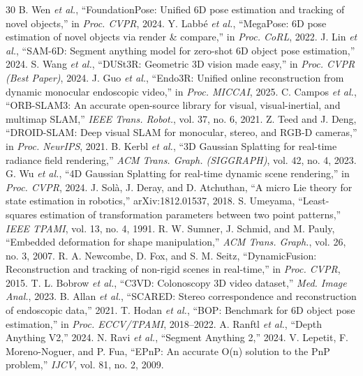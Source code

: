 \documentclass[journal]{IEEEtran}
\begin{document}
\begin{thebibliography}{30}
 B. Wen \emph{et al.}, ``FoundationPose: Unified 6D pose estimation and tracking of novel objects,'' in \emph{Proc. CVPR}, 2024.
 Y. Labb\'e \emph{et al.}, ``MegaPose: 6D pose estimation of novel objects via render \& compare,'' in \emph{Proc. CoRL}, 2022.
 J. Lin \emph{et al.}, ``SAM-6D: Segment anything model for zero-shot 6D object pose estimation,'' 2024.
 S. Wang \emph{et al.}, ``DUSt3R: Geometric 3D vision made easy,'' in \emph{Proc. CVPR (Best Paper)}, 2024.
 J. Guo \emph{et al.}, ``Endo3R: Unified online reconstruction from dynamic monocular endoscopic video,'' in \emph{Proc. MICCAI}, 2025.
 C. Campos \emph{et al.}, ``ORB-SLAM3: An accurate open-source library for visual, visual-inertial, and multimap SLAM,'' \emph{IEEE Trans. Robot.}, vol. 37, no. 6, 2021.
 Z. Teed and J. Deng, ``DROID-SLAM: Deep visual SLAM for monocular, stereo, and RGB-D cameras,'' in \emph{Proc. NeurIPS}, 2021.
 B. Kerbl \emph{et al.}, ``3D Gaussian Splatting for real-time radiance field rendering,'' \emph{ACM Trans. Graph. (SIGGRAPH)}, vol. 42, no. 4, 2023.
 G. Wu \emph{et al.}, ``4D Gaussian Splatting for real-time dynamic scene rendering,'' in \emph{Proc. CVPR}, 2024.
 J. Sol\`a, J. Deray, and D. Atchuthan, ``A micro Lie theory for state estimation in robotics,'' arXiv:1812.01537, 2018.
 S. Umeyama, ``Least-squares estimation of transformation parameters between two point patterns,'' \emph{IEEE TPAMI}, vol. 13, no. 4, 1991.
 R. W. Sumner, J. Schmid, and M. Pauly, ``Embedded deformation for shape manipulation,'' \emph{ACM Trans. Graph.}, vol. 26, no. 3, 2007.
 R. A. Newcombe, D. Fox, and S. M. Seitz, ``DynamicFusion: Reconstruction and tracking of non-rigid scenes in real-time,'' in \emph{Proc. CVPR}, 2015.
 T. L. Bobrow \emph{et al.}, ``C3VD: Colonoscopy 3D video dataset,'' \emph{Med. Image Anal.}, 2023.
 B. Allan \emph{et al.}, ``SCARED: Stereo correspondence and reconstruction of endoscopic data,'' 2021.
 T. Hodan \emph{et al.}, ``BOP: Benchmark for 6D object pose estimation,'' in \emph{Proc. ECCV/TPAMI}, 2018--2022.
 A. Ranftl \emph{et al.}, ``Depth Anything V2,'' 2024.
 N. Ravi \emph{et al.}, ``Segment Anything 2,'' 2024.
 V. Lepetit, F. Moreno-Noguer, and P. Fua, ``EPnP: An accurate O(n) solution to the PnP problem,'' \emph{IJCV}, vol. 81, no. 2, 2009.

\end{thebibliography}
\end{document}
